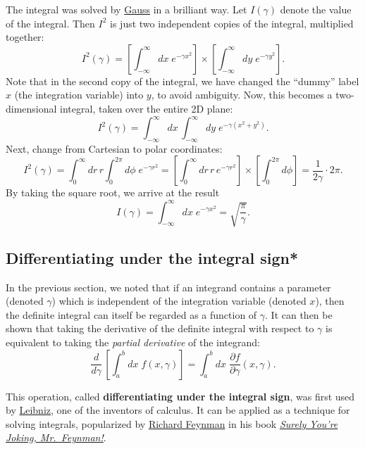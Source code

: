 \documentclass[10pt,a4paper]{article}
\begin{document}
The integral was solved by
\href{http://en.wikipedia.org/wiki/Carl_Friedrich_Gauss}{Gauss} in a
brilliant way. Let $I(\gamma)$ denote the value of the integral. Then
$I^2$ is just two independent copies of the integral, multiplied
together:
\begin{equation}
I^2(\gamma) = \left[\int_{-\infty}^\infty dx\; e^{-\gamma x^2}\right] \times \left[\int_{-\infty}^\infty dy\; e^{-\gamma y^2}\right].
\end{equation}
Note that in the second copy of the integral, we have changed the
``dummy'' label $x$ (the integration variable) into $y$, to avoid
ambiguity. Now, this becomes a two-dimensional integral, taken over the
entire 2D plane:
\begin{equation}
I^2(\gamma) = \int_{-\infty}^\infty dx\, \int_{-\infty}^\infty dy \; e^{-\gamma (x^2+y^2)}.
\end{equation}
Next, change from Cartesian to polar coordinates:
\begin{equation}
I^2(\gamma) = \int_{0}^\infty dr\, r \int_{0}^{2\pi} d\phi \; e^{-\gamma r^2} = \left[ \int_{0}^\infty dr\, r \, e^{-\gamma r^2}\right] \times \left[\int_{0}^{2\pi} d\phi \right] = \frac{1}{2\gamma} \cdot 2\pi.
\end{equation}
By taking the square root, we arrive at the result
\begin{equation}
I(\gamma) = \int_{-\infty}^\infty dx \; e^{-\gamma x^2} = \sqrt{\frac{\pi}{\gamma}}.
\end{equation}

\subsection{Differentiating under the integral sign*}
\label{differentiating-under-the-integral-sign}

In the previous section, we noted that if an integrand contains a
parameter (denoted $\gamma$) which is independent of the integration
variable (denoted $x$), then the definite integral can itself be
regarded as a function of $\gamma$. It can then be shown that taking
the derivative of the definite integral with respect to $\gamma$ is
equivalent to taking the \emph{partial derivative} of the integrand:
\begin{equation}
\frac{d}{d\gamma} \, \left[\int_a^b dx\; f(x,\gamma)\right] = \int_a^b dx \; \frac{\partial f}{\partial \gamma}(x,\gamma).
\end{equation}

This operation, called \textbf{differentiating under the integral sign},
was first used by
\href{https://en.wikipedia.org/wiki/Gottfried_Wilhelm_Leibniz}{Leibniz},
one of the inventors of calculus. It can be applied as a technique for
solving integrals, popularized by
\href{https://en.wikipedia.org/wiki/Richard_Feynman}{Richard Feynman}
in his book
\href{https://en.wikipedia.org/wiki/Surely_You\%27re_Joking,_Mr._Feynman!}{\emph{Surely You're Joking, Mr.~Feynman!}}.
\end{document}
